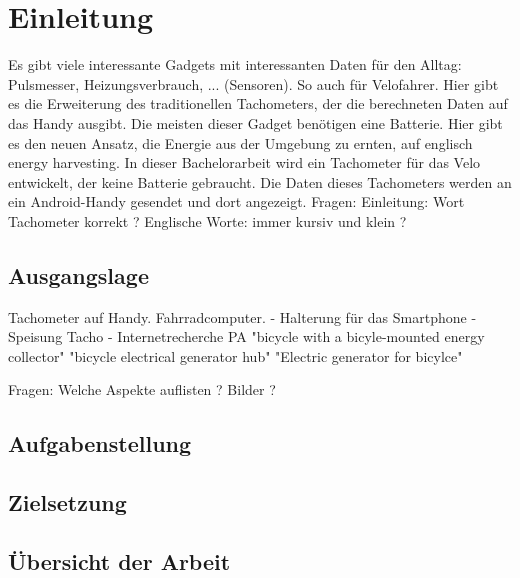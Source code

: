 \chapter{Einleitung}
Es gibt viele interessante Gadgets mit interessanten Daten für den Alltag: Pulsmesser, Heizungsverbrauch, ... (Sensoren). So auch für Velofahrer. Hier gibt es die Erweiterung des traditionellen Tachometers, der die berechneten Daten auf das Handy ausgibt. 
Die meisten dieser Gadget benötigen eine Batterie. Hier gibt es den neuen Ansatz, die Energie aus der Umgebung zu ernten, auf englisch energy harvesting. In dieser Bachelorarbeit wird ein Tachometer für das Velo entwickelt, der keine Batterie gebraucht. Die Daten dieses Tachometers werden an ein Android-Handy gesendet und dort angezeigt.
Fragen:
Einleitung: Wort Tachometer korrekt ?
Englische Worte: immer kursiv und klein ?

\section{Ausgangslage}
Tachometer auf Handy.
Fahrradcomputer.
- Halterung für das Smartphone
- Speisung Tacho
- Internetrecherche PA \cite{PA_bicycle} 
   "bicycle with a bicyle-mounted energy collector"
   "bicycle electrical generator hub"
   "Electric generator for bicylce"

Fragen:
Welche Aspekte auflisten ?  
Bilder ?

\section{Aufgabenstellung}



\section{Zielsetzung}





\section{Übersicht der Arbeit}
